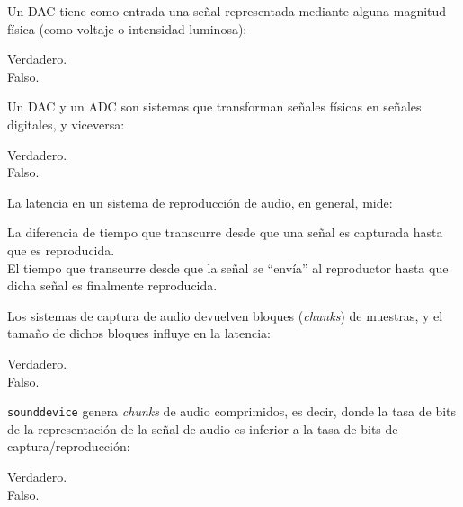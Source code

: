 \documentclass[legalpaper, 12pt, addpoints]{exam}
\begin{document}
\begin{questions}
\question Un DAC tiene como entrada una señal representada mediante
alguna magnitud física (como voltaje o intensidad luminosa):

\begin{oneparchoices}
  \choice Verdadero.\\
  \choice Falso.
\end{oneparchoices}
  
\vspace{0.10in}

\question Un DAC y un ADC son sistemas que transforman señales
físicas en señales digitales, y viceversa:

\begin{oneparchoices}
  \choice Verdadero.\\
  \choice Falso.
\end{oneparchoices}
  
\vspace{0.10in}

\question La latencia en un sistema de reproducción de audio, en general, mide:

\begin{oneparchoices}
  \choice La diferencia de tiempo que transcurre desde que una señal es capturada hasta que es reproducida.\\
  \choice El tiempo que transcurre desde que la señal se ``envía'' al
  reproductor hasta que dicha señal es finalmente reproducida.
\end{oneparchoices}
  
\vspace{0.10in}

\question Los sistemas de captura de audio devuelven bloques (\emph{chunks})
de muestras, y el tamaño de dichos bloques influye en la latencia:

\begin{oneparchoices}
  \choice Verdadero.\\
  \choice Falso.
\end{oneparchoices}
  
\vspace{0.10in}

\question \texttt{sounddevice} genera \emph{chunks} de audio
comprimidos, es decir, donde la tasa de bits de la representación de
la señal de audio es inferior a la tasa de bits de
captura/reproducción:

\begin{oneparchoices}
  \choice Verdadero.\\
  \choice Falso.
\end{oneparchoices}
  

\end{questions}
\end{document}
